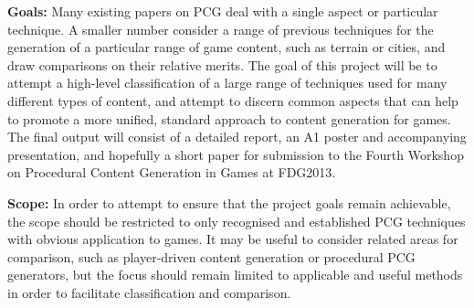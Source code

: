 \documentclass[12pt]{article}
\begin{document}
{\bf Goals:} Many existing papers on PCG deal with a single aspect or particular technique. A smaller number consider a range of previous techniques for the generation of a particular range of game content, such as terrain or cities, and draw comparisons on their relative merits. The goal of this project will be to attempt a high-level classification of a large range of techniques used for many different types of content, and attempt to discern common aspects that can help to promote a more unified, standard approach to content generation for games. The final output will consist of a detailed report, an A1 poster and accompanying presentation, and hopefully a short paper for submission to the Fourth Workshop on Procedural Content Generation in Games at FDG2013.

{\bf Scope:} In order to attempt to ensure that the project goals remain achievable, the scope should be restricted to only recognised and established PCG techniques with obvious application to games. It may be useful to consider related areas for comparison, such as player-driven content generation or procedural PCG generators, but the focus should remain limited to applicable and useful methods in order to facilitate classification and comparison.
\end{document}
